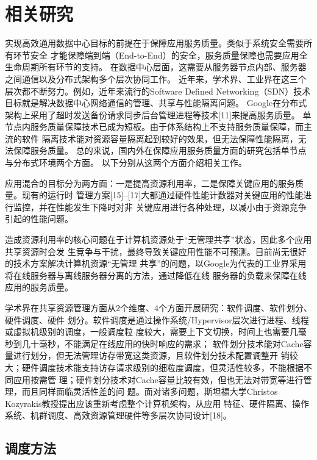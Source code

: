 

\chapter{相关研究}
\label{chap:related}

实现高效通用数据中心目标的前提在于保障应用服务质量。类似于系统安全需要所有环节安全
才能保障端到端（End-to-End）的安全，服务质量保障也需要应用全生命周期所有环节的支持。
在数据中心层面，这需要从服务器节点内部、服务器之间通信以及分布式架构多个层次协同工作。
近年来，学术界、工业界在这三个层次都不断努力。例如，近年来流行的Software Defined
Networking（SDN）技术\cite{SDN}目标就是解决数据中心网络通信的管理、共享与性能隔离问题。
Google在分布式架构上采用了超时发送备份请求同步后台管理进程等技术[11]来提高服务质量。
单节点内服务质量保障技术已成为短板。由于体系结构上不支持服务质量保障，而主流的软件
隔离技术能对资源容量隔离起到较好的效果，但无法保障性能隔离，无法保障服务质量。
总的来说，国内外在保障应用服务质量方面的研究包括单节点与分布式环境两个方面。
以下分别从这两个方面介绍相关工作。


应用混合的目标分为两方面：一是提高资源利用率，二是保障关键应用的服务质量。现有的运行时
管理方案[15]–[17]大都通过硬件性能计数器对关键应用的性能进行监控，并在性能发生下降时对非
关键应用进行各种处理，以减小由于资源竞争引起的性能问题。

造成资源利用率的核心问题在于计算机资源处于“无管理共享”状态，因此多个应用共享资源时会发
生竞争与干扰，最终导致关键应用性能不可预测。目前尚无很好的技术方案解决计算机资源“无管理
共享”的问题，以Google为代表的工业界采用将在线服务器与离线服务器分离的方法，通过降低在线
服务器的负载来保障在线应用的服务质量。

学术界在共享资源管理方面从2个维度、4个方面开展研究：软件调度、软件划分、硬件调度、硬件
划分。软件调度是通过操作系统/Hypervisor层次进行进程、线程或虚拟机级别的调度，一般调度粒
度较大，需要上下文切换，时间上也需要几毫秒到几十毫秒，不能满足在线应用的快时响应的需求；
软件划分技术能对Cache容量进行划分，但无法管理访存带宽这类资源，且软件划分技术配置调整开
销较大；硬件调度技术能支持访存请求级别的细粒度调度，但灵活性较多，不能根据不同应用按需管
理；硬件划分技术对Cache容量比较有效，但也无法对带宽等进行管理，而且同样面临灵活性差的问
题。面对诸多问题，斯坦福大学Christos Kozyrakis教授提出应该重新考虑整个计算机架构，从应用
特征、硬件隔离、操作系统、机群调度、高效资源管理硬件等多层次协同设计[18]。

\section{调度方法}
\label{sec:other}


